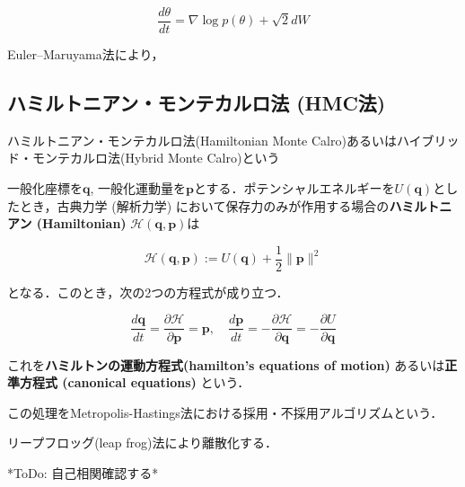 \begin{equation}
{\frac{d\theta}{dt}}=\nabla \log p (\theta)+{\sqrt 2}{d{W}}
\end{equation}


Euler–Maruyama法により，





\subsection{ハミルトニアン・モンテカルロ法 (HMC法)}
ハミルトニアン・モンテカルロ法(Hamiltonian Monte Calro)あるいはハイブリッド・モンテカルロ法(Hybrid Monte Calro)という

一般化座標を$\mathbf{q}$, 一般化運動量を$\mathbf{p}$とする．ポテンシャルエネルギーを$U(\mathbf{q})$としたとき，古典力学 (解析力学) において保存力のみが作用する場合の\textbf{ハミルトニアン (Hamiltonian)} $\mathcal{H}(\mathbf{q}, \mathbf{p})$は


\begin{equation}
\mathcal{H}(\mathbf{q}, \mathbf{p}):=U(\mathbf{q})+\frac{1}{2}\|\mathbf{p}\|^2
\end{equation}


となる．このとき，次の2つの方程式が成り立つ．


\begin{equation}
\frac{d\mathbf{q}}{dt}=\frac{\partial \mathcal{H}}{\partial \mathbf{p}}=\mathbf{p},\quad\frac{d\mathbf{p}}{dt}=-\frac{\partial \mathcal{H}}{\partial \mathbf{q}}=-\frac{\partial U}{\partial \mathbf{q}}
\end{equation}


これを\textbf{ハミルトンの運動方程式(hamilton's equations of motion)} あるいは\textbf{正準方程式 (canonical equations)} という．


この処理をMetropolis-Hastings法における採用・不採用アルゴリズムという．

リープフロッグ(leap frog)法により離散化する．






*ToDo: 自己相関確認する*
